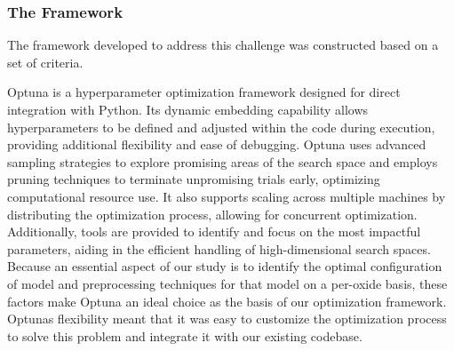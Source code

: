 \subsubsection{The Framework}
The framework developed to address this challenge was constructed based on a set of criteria.

















Optuna is a hyperparameter optimization framework designed for direct integration with Python. Its dynamic embedding capability allows hyperparameters to be defined and adjusted within the code during execution, providing additional flexibility and ease of debugging. 
Optuna uses advanced sampling strategies to explore promising areas of the search space and employs pruning techniques to terminate unpromising trials early, optimizing computational resource use. 
It also supports scaling across multiple machines by distributing the optimization process, allowing for concurrent optimization. 
Additionally, tools are provided to identify and focus on the most impactful parameters, aiding in the efficient handling of high-dimensional search spaces. \cite{optuna_2019} 
Because an essential aspect of our study is to identify the optimal configuration of model and preprocessing techniques for that model on a per-oxide basis, these factors make Optuna an ideal choice as the basis of our optimization framework.
Optunas flexibility meant that it was easy to customize the optimization process to solve this problem and integrate it with our existing codebase.

